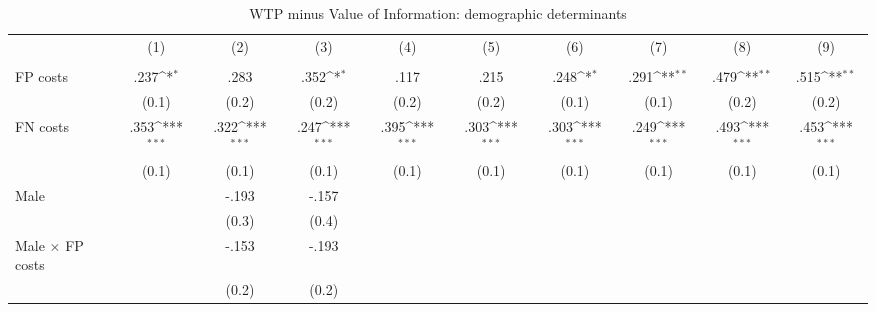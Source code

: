 \begin{table}[htbp]\centering
\def\sym#1{\ifmmode^{#1}\else\(^{#1}\)\fi}
\caption{WTP minus Value of Information: demographic determinants}
\begin{tabular}{l*{9}{c}}
\hline\hline
                &\multicolumn{1}{c}{(1)}&\multicolumn{1}{c}{(2)}&\multicolumn{1}{c}{(3)}&\multicolumn{1}{c}{(4)}&\multicolumn{1}{c}{(5)}&\multicolumn{1}{c}{(6)}&\multicolumn{1}{c}{(7)}&\multicolumn{1}{c}{(8)}&\multicolumn{1}{c}{(9)}\\
                &\multicolumn{1}{c}{}&\multicolumn{1}{c}{}&\multicolumn{1}{c}{}&\multicolumn{1}{c}{}&\multicolumn{1}{c}{}&\multicolumn{1}{c}{}&\multicolumn{1}{c}{}&\multicolumn{1}{c}{}&\multicolumn{1}{c}{}\\
\hline
FP costs        &     .237\sym{*}  &     .283         &     .352\sym{*}  &     .117         &     .215         &     .248\sym{*}  &     .291\sym{**} &     .479\sym{**} &     .515\sym{**} \\
                &    (0.1)         &    (0.2)         &    (0.2)         &    (0.2)         &    (0.2)         &    (0.1)         &    (0.1)         &    (0.2)         &    (0.2)         \\
FN costs        &     .353\sym{***}&     .322\sym{***}&     .247\sym{***}&     .395\sym{***}&     .303\sym{***}&     .303\sym{***}&     .249\sym{***}&     .493\sym{***}&     .453\sym{***}\\
                &    (0.1)         &    (0.1)         &    (0.1)         &    (0.1)         &    (0.1)         &    (0.1)         &    (0.1)         &    (0.1)         &    (0.1)         \\
Male            &                  &    -.193         &    -.157         &                  &                  &                  &                  &                  &                  \\
                &                  &    (0.3)         &    (0.4)         &                  &                  &                  &                  &                  &                  \\
Male $\times$ FP costs&                  &    -.153         &    -.193         &                  &                  &                  &                  &                  &                  \\
                &                  &    (0.2)         &    (0.2)         &                  &                  &                  &                  &                  &                  \\

\end{tabular}
\end{table}
